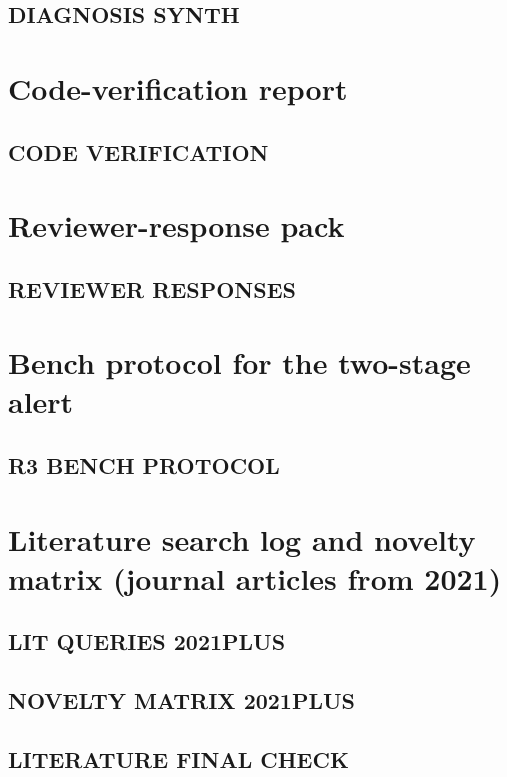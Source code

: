 \documentclass[10pt,a4paper]{article}
\begin{document}
\subsection{DIAGNOSIS SYNTH}


\section{Code-verification report}

\subsection{CODE VERIFICATION}


\section{Reviewer-response pack}

\subsection{REVIEWER RESPONSES}


\section{Bench protocol for the two-stage alert}

\subsection{R3 BENCH PROTOCOL}


\section{Literature search log and novelty matrix (journal articles from 2021)}

\subsection{LIT QUERIES 2021PLUS}


\subsection{NOVELTY MATRIX 2021PLUS}


\subsection{LITERATURE FINAL CHECK}

\end{document}
